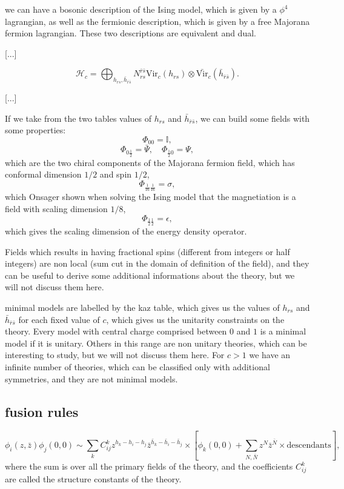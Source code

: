 we can have a bosonic description of the Ising model, which is given by a \(\phi^4\) lagrangian, as well as the fermionic description, which is given by a free Majorana fermion lagrangian. These two descriptions are equivalent and dual.


    [...]

\[
    \mathcal{H}_c = \bigoplus_{h_{rs}, \bar{h}_{\bar{r}\bar{s}}} N_{rs}^{\bar{r}\bar{s}} \mathrm{Vir}_c(h_{rs}) \otimes \bar{\mathrm{Vir}}_{c}(\bar{h}_{\bar{r}\bar{s}}).
\]

[...]


If we take from the two tables values of \(h_{rs}\) and \(\bar{h}_{\bar{r}\bar{s}}\), we can build some fields with some properties:
\[
    \Phi_{00} = \mathbb{I},
\]
\[
    \Phi_{0 \frac{1}{2}} = \bar{\Psi}, \quad \Phi_{\frac{1}{2} 0} = \Psi,
\]
which are the two chiral components of the Majorana fermion field, which has conformal dimension \(1/2\) and spin \(1/2\),
\[
    \Phi_{\frac{1}{16} \frac{1}{16}} = \sigma,
\]
which Onsager shown when solving the Ising model that the magnetiation is a field with scaling dimension \(1/8\),
\[
    \Phi_{\frac{1}{2} \frac{1}{2}} = \epsilon,
\]
which gives the scaling dimension of the energy density operator.

Fields which results in having fractional spins (different from integers or half integers) are non local (sum cut in the domain of definition of the field), and they can be useful to derive some additional informations about the theory, but we will not discuss them here.

minimal models are labelled by the kaz table, which gives us the values of \(h_{rs}\) and \(\bar{h}_{\bar{r}\bar{s}}\) for each fixed value of \(c\), which gives us the unitarity constraints on the theory. Every model with central charge comprised between \(0\) and \(1\) is a minimal model if it is unitary. Others in this range are non unitary theories, which can be interesting to study, but we will not discuss them here. For \(c>1\) we have an infinite number of theories, which can be classified only with additional symmetries, and they are not minimal models.

\subsection{fusion rules}

\[
    \phi_i (z, \bar{z}) \phi_j (0, 0) \sim \sum_k C_{ij}^k z^{h_k - h_i - h_j} \bar{z}^{\bar{h}_k - \bar{h}_i - \bar{h}_j} \times \left[ \phi_k(0, 0) + \sum_{N, \bar{N}}z^N \bar{z}^{\bar{N}} \times \text{descendants}\right],
\]
where the sum is over all the primary fields of the theory, and the coefficients \(C_{ij}^k\) are called the structure constants of the theory.

